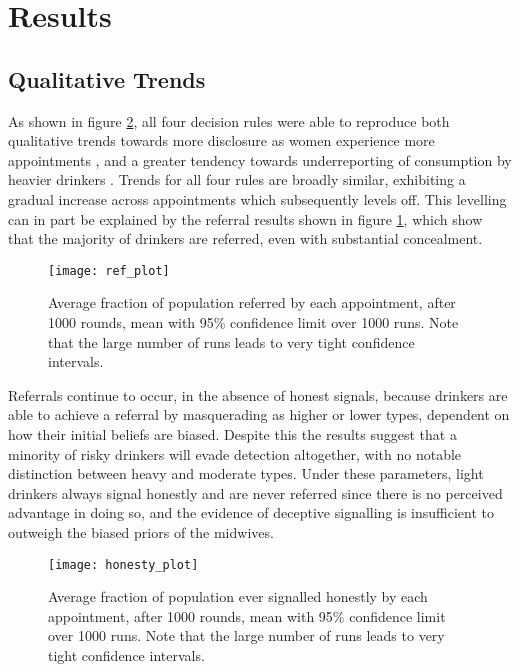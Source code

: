 \section{Results}
\label{sec:results}


\subsection{Qualitative Trends}
\label{sub:qt_results}

As shown in figure \ref{fig:honest_signals}, all four decision rules were able to reproduce both qualitative trends towards more disclosure as women experience more appointments \citep{Phillips2007}, and a greater tendency towards underreporting of consumption by heavier drinkers \citep{Alvik2006}.  
Trends for all four rules are broadly similar, exhibiting a gradual increase across appointments which subsequently levels off. This levelling can in part be explained by the referral results shown in figure \ref{fig:ref_plot}, which show that the majority of drinkers are referred, even with substantial concealment. 

\begin{figure}[H]
\texttt{[image: ref\_plot]}
\caption{Average fraction of population referred by each appointment, after 1000 rounds, mean with 95\% confidence limit over 1000 runs. Note that the large number of runs leads to very tight confidence intervals.\label{fig:ref_plot}}
\end{figure}

Referrals continue to occur, in the absence of honest signals, because drinkers are able to achieve a referral by masquerading as higher or lower types, dependent on how their initial beliefs are biased. Despite this the results suggest that a minority of risky drinkers will evade detection altogether, with no notable distinction between heavy and moderate types. Under these parameters, light drinkers always signal honestly and are never referred since there is no perceived advantage in doing so, and the evidence of deceptive signalling is insufficient to outweigh the biased priors of the midwives. 

\begin{figure}[H]
\texttt{[image: honesty\_plot]}
\caption{Average fraction of population ever signalled honestly by each appointment, after 1000 rounds, mean with 95\% confidence limit over 1000 runs. Note that the large number of runs leads to very tight confidence intervals.\label{fig:honest_signals}}
\end{figure}

